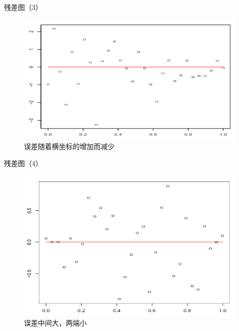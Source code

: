 \documentclass[ignorenonframetext,]{beamer}
\begin{document}
\begin{frame}{残差图（3）}
\protect\hypertarget{3}{}

\begin{figure}
\includegraphics[width=0.9\linewidth]{error3} \caption{误差随着横坐标的增加而减少}\label{fig:unnamed-chunk-16}
\end{figure}

\end{frame}

\begin{frame}{残差图（4）}
\protect\hypertarget{4}{}

\begin{figure}
\includegraphics[width=0.9\linewidth]{error4} \caption{误差中间大，两端小}\label{fig:unnamed-chunk-17}
\end{figure}

\end{frame}
\end{document}
